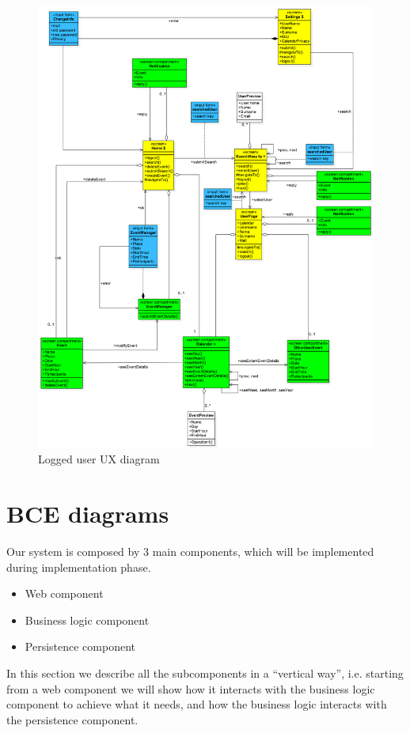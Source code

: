 \documentclass[10pt,a4paper,titlepage]{article}
\begin{document}
\begin{figure}[h]
\centering
\includegraphics[width=\linewidth]{./images/UX_logged}
\caption[Logged ux]{Logged user UX diagram}
\label{fig:UX_logged}
\end{figure}

\clearpage
\section{BCE diagrams}
Our system is composed by 3 main components, which will be implemented during implementation phase.
\begin{itemize}
\item Web component
\item Business logic component
\item Persistence component
\end{itemize}
In this section we describe all the subcomponents in a ``vertical way'', i.e. starting from a web component we will show how it interacts with the business logic component to achieve what it needs, and how the business logic interacts with the persistence component.
\end{document}
